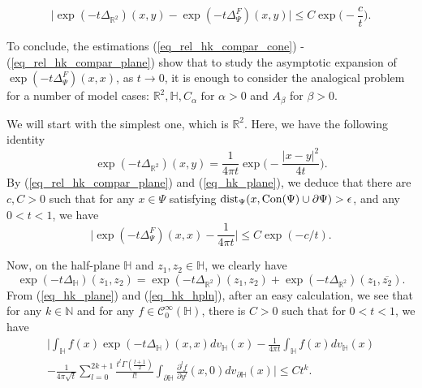 \documentclass[12pt]{article}
\numberwithin{equation}{section}
\theoremstyle{theorem}
\theoremstyle{definition}
\theoremstyle{remark}
\newcommand{\real}{\mathbb{R}}
\newcommand{\nat}{\mathbb{N}}
\newcommand{\dist}{{\rm{dist}}}
\newcommand{\ccal}{\mathscr{C}}
\newcommand{\laplcomp}{\Delta}
\newcommand{\hh}{\mathbb{H}}
\begin{document}
	\begin{equation}\label{eq_rel_hk_compar_plane}
		\Big| \exp(- t \laplcomp_{\real^2})(x, y) -  \exp(- t \laplcomp_{\Psi}^{F})(x, y) \Big| \leq C \exp\Big( - \frac{c}{t} \Big).
	\end{equation}
	\begin{sloppypar}
	To conclude, the estimations (\ref{eq_rel_hk_compar_cone}) - (\ref{eq_rel_hk_compar_plane}) show that to study the asymptotic expansion of $\exp(- t \laplcomp_{\Psi}^{F})(x, x)$, as $t \to 0$, it is enough to consider the analogical problem for a number of model cases: $\real^2, \hh, C_{\alpha} \text{ for } \alpha > 0$ and $A_{\beta}$ for $\beta > 0$.
	\end{sloppypar}
	\par We will start with the simplest one, which is $\real^2$. 
	Here, we have the following identity
	\begin{equation}\label{eq_hk_plane}
		\exp(- t \laplcomp_{\real^2})(x, y) = \frac{1}{4 \pi t} \exp \Big(- \frac{|x - y|^2}{4t} \Big).
	\end{equation}
	By (\ref{eq_rel_hk_compar_plane}) and (\ref{eq_hk_plane}), we deduce that there are $c, C > 0$ such that for any $x \in \Psi$ satisfying $\dist_{\Psi}(x, {\rm{Con}}(\Psi) \cup \partial \Psi) > \epsilon$, and any $0 < t < 1$, we have
	\begin{equation}\label{eq_hk_exp_plane}
		\Big| \exp(- t \laplcomp_{\Psi}^{F})(x, x) - \frac{1}{4 \pi t} \Big|  \leq C \exp(-c/t).
	\end{equation}
	\par 
	Now, on the half-plane $\hh$ and $z_1, z_2 \in \hh$, we clearly have
	\begin{equation}\label{eq_hk_hpln}
		\exp(- t \laplcomp_{\hh})(z_1, z_2) = \exp(- t \laplcomp_{\real^2})(z_1, z_2) + \exp(- t \laplcomp_{\real^2})(z_1, \overline{z_2}).
	\end{equation}
	From (\ref{eq_hk_plane}) and (\ref{eq_hk_hpln}), after an easy calculation, we see that for any $k \in \nat$ and for any $f \in \ccal^{\infty}_{0}(\hh)$, there is $C > 0$ such that for $0 < t < 1$, we have
	\begin{multline}\label{eq_hk_exp_half_full}
		\Big|
		\int_{\hh} f(x) \exp(- t \laplcomp_{\hh})(x, x) dv_{\hh}(x) 
		- \frac{1 }{4 \pi t} \int_{\hh} f(x) dv_{\hh}(x)
		\\
		- \frac{1}{4 \pi \sqrt{t}} \sum_{l = 0}^{2 k + 1} \frac{t^l \Gamma(\frac{l + 1}{2})}{l!} \int_{\partial \hh }\frac{\partial^{l} f}{\partial y^{l}}(x, 0) dv_{\partial \hh}(x)
		\Big|
		\leq
		C t^{k}.
	\end{multline}
\end{document}
